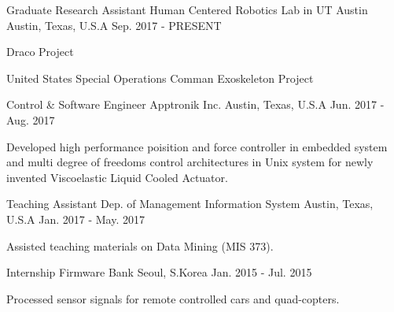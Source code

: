 

\begin{cventries}

  \cventry
    {Graduate Research Assistant} %
    {Human Centered Robotics Lab in UT Austin} %
    {Austin, Texas, U.S.A} %
    {Sep. 2017 - PRESENT} %
    {
      \begin{cvitems} %
        \item {Draco Project}
        \item {United States Special Operations Comman Exoskeleton Project}
      \end{cvitems}
    }

  \cventry
    {Control \& Software Engineer} %
    {Apptronik Inc.} %
    {Austin, Texas, U.S.A} %
    {Jun. 2017 - Aug. 2017} %
    {
      \begin{cvitems} %
        \item {Developed high performance poisition and force controller in
              embedded system and multi degree of freedoms control
              architectures in Unix system for newly invented Viscoelastic
              Liquid Cooled Actuator.}
      \end{cvitems}
    }

  \cventry
    {Teaching Assistant} %
    {Dep. of Management Information System} %
    {Austin, Texas, U.S.A} %
    {Jan. 2017 - May. 2017} %
    {
      \begin{cvitems} %
        \item {Assisted teaching materials on Data Mining (MIS 373).}
      \end{cvitems}
    }

  \cventry
    {Internship} %
    {Firmware Bank} %
    {Seoul, S.Korea} %
    {Jan. 2015 - Jul. 2015} %
    {
      \begin{cvitems} %
        \item {Processed sensor signals for remote controlled cars and quad-copters.}
      \end{cvitems}
    }
\end{cventries}

